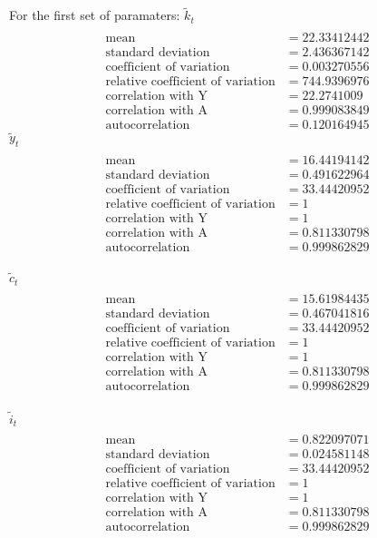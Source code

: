 \documentclass[letterpaper,12pt]{article}
\theoremstyle{definition}
\begin{document}
For the first set of paramaters:
$\tilde{k}_t$
\begin{align*}
\\\text{mean} &= 22.33412442
\\\text{standard deviation} &= 2.436367142
\\\text{coefficient of variation}&=0.003270556
\\\text{relative coefficient of variation}&=744.9396976
\\\text{correlation with Y}&=22.2741009
\\\text{correlation with A}&=0.999083849
\\\text{autocorrelation}&=0.120164945
\end{align*}
$\tilde{y}_t$
\begin{align*}
\\\text{mean} &= 16.44194142
\\\text{standard deviation} &= 	0.491622964
\\\text{coefficient of variation}&=33.44420952
\\\text{relative coefficient of variation}&=1
\\\text{correlation with Y}&=1
\\\text{correlation with A}&=0.811330798
\\\text{autocorrelation}&=0.999862829
\end{align*}
\\
$\tilde{c}_t$
\begin{align*}
\\\text{mean} &= 15.61984435
\\\text{standard deviation} &= 	0.467041816
\\\text{coefficient of variation}&=33.44420952
\\\text{relative coefficient of variation}&=1
\\\text{correlation with Y}&=1
\\\text{correlation with A}&=0.811330798
\\\text{autocorrelation}&=0.999862829
\end{align*}
\\
$\tilde{i}_t$
\begin{align*}
\\\text{mean} &= 0.822097071
\\\text{standard deviation} &= 	0.024581148
\\\text{coefficient of variation}&=33.44420952
\\\text{relative coefficient of variation}&=1
\\\text{correlation with Y}&=1
\\\text{correlation with A}&=0.811330798
\\\text{autocorrelation}&=0.999862829
\end{align*}
\end{document}
